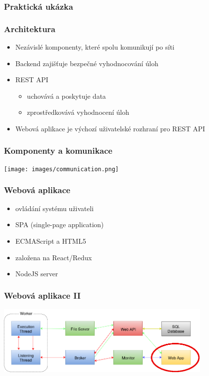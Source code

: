 \documentclass{beamer}
\begin{document}
\begin{frame}
	\frametitle{Praktická ukázka}
\end{frame}

\begin{frame}
	\frametitle{Architektura}
	\begin{itemize}
		\item Nezávislé komponenty, které spolu komunikují po síti
		\item Backend zajišťuje bezpečné vyhodnocování úloh
		\item REST API 
			\begin{itemize}
				\item uchovává a poskytuje data
				\item zprostředkovává vyhodnocení úloh
			\end{itemize}
		\item Webová aplikace je výchozí uživatelské rozhraní pro REST API
	\end{itemize}
\end{frame}

\begin{frame}
	\frametitle{Komponenty a komunikace}
	\begin{center}
		\texttt{[image: images/communication.png]}
	\end{center}
\end{frame}

\begin{frame}
	\frametitle{Webová aplikace}
	\begin{itemize}
		\item ovládání systému uživateli
		\item SPA (single-page application)
		\item ECMAScript a HTML5
		\item založena na React/Redux
		\item NodeJS server
	\end{itemize}
\end{frame}

\begin{frame}
	\frametitle{Webová aplikace II}
	\begin{center}
		\includegraphics[width=0.8\textwidth]{images/communication-webapp.png}
	\end{center}
\end{frame}
\end{document}
